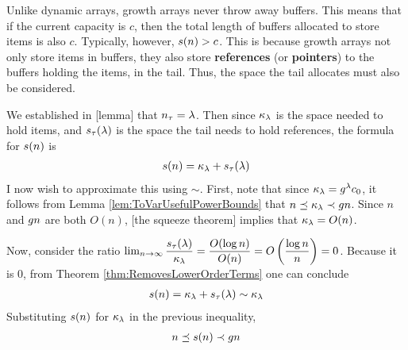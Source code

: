 \HdrSpaceComplex

Unlike dynamic arrays, growth arrays never throw away buffers. This means that if the current capacity is $c$, then the total length of buffers allocated to store items is also $c$. Typically, however, $s(n) > c$. This is because growth arrays not only store items in buffers, they also store \textbf{references} (or \textbf{pointers}) to the buffers holding the items, in the tail. Thus, the space the tail allocates must also be considered.

We established in [lemma] that $n_\tau = \lambda$. Then since $\kappa_\lambda$ is the space needed to hold items, and $s_\tau(\lambda)$ is the space the tail needs to hold references, the formula for $s(n)$ is
\begin{align*}
s(n) = \kappa_\lambda + s_\tau(\lambda)
\end{align*}
I now wish to approximate this using $\sim$. First, note that since $\kappa_\lambda = g^\lambda c_0$, it follows from Lemma \ref{lem:ToVarUsefulPowerBounds} that $n \preceq \kappa_\lambda \prec g{n}$. Since $n$ and $g{n}$ are both $O(n)$, [the squeeze theorem] implies that $\kappa_\lambda = O(n)$.

Now, consider the ratio $\lim_{n \to \infty} \dfrac {s_\tau(\lambda)} {\kappa_\lambda} = \dfrac {O(\log n)} {O(n)} = O \left( \dfrac{\log n}{n} \right) = 0$. Because it is $0$, from Theorem \ref{thm:RemovesLowerOrderTerms} one can conclude
\begin{align*}
s(n) = \kappa_\lambda + s_\tau(\lambda) \sim \kappa_\lambda
\end{align*}
Substituting $s(n)$ for $\kappa_\lambda$ in the previous inequality,
\begin{align*}
n \preceq s(n) \prec g{n}
\end{align*}